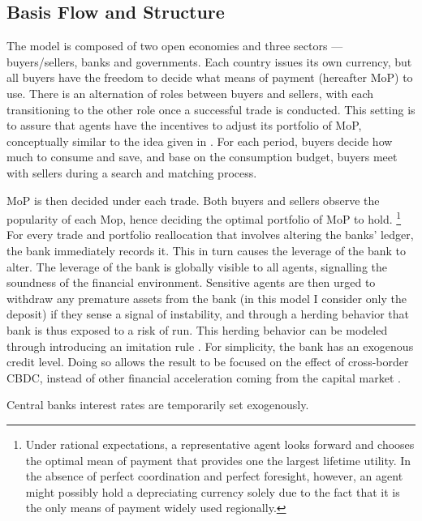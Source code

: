 \subsection{Basis Flow and Structure}

The model is composed of two open economies and three sectors --- buyers/sellers,
banks and governments. Each country issues its own currency, but all buyers have
the freedom to decide what means of payment (hereafter MoP) to use.  There is
an alternation of roles between buyers and sellers, with each transitioning to
the other role once a successful trade is conducted. This setting is to assure
that agents have the incentives to adjust its portfolio of MoP, conceptually
similar to the idea given in \citet*{TW95}. For each period, buyers decide how
much to consume and save, and base on the consumption budget, buyers meet with
sellers during a search and matching process.

MoP is then decided under each trade. Both buyers and sellers observe the
popularity of each Mop, hence deciding the optimal portfolio of MoP to hold.
\footnote{Under rational expectations, a representative agent looks forward and
chooses the optimal mean of payment that provides one the largest lifetime
utility. In the absence of perfect coordination and perfect foresight, however,
an agent might possibly hold a depreciating currency solely due to the fact that
it is the only means of payment widely used regionally.}
For every trade and portfolio reallocation that involves altering the banks'
ledger, the bank immediately records it. This in turn causes the leverage of the
bank to alter. The leverage of the bank is globally visible to all agents,
signalling the soundness of the financial environment. Sensitive agents are then
urged to withdraw any premature assets from the bank (in this model I consider
only the deposit) if they sense a signal of instability, and through a herding
behavior that bank is thus exposed to a risk of run. This herding behavior can be
modeled through introducing an imitation rule \citep*{Santos2021}. For
simplicity, the bank has an exogenous credit level. Doing so allows the result
to be focused on the effect of cross-border CBDC, instead of other financial
acceleration coming from the capital market \citep{BGG96}.

Central banks interest rates are temporarily set exogenously.



